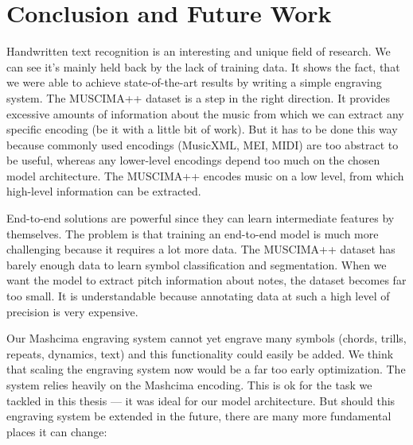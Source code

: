 \chapter{Conclusion and Future Work}
\label{chap:ConclusionAndFutureWork}

Handwritten text recognition is an interesting and unique field of research. We can see it's mainly held back by the lack of training data. It shows the fact, that we were able to achieve state-of-the-art results by writing a simple engraving system. The MUSCIMA++ dataset is a step in the right direction. It provides excessive amounts of information about the music from which we can extract any specific encoding (be it with a little bit of work). But it has to be done this way because commonly used encodings (MusicXML, MEI, MIDI) are too abstract to be useful, whereas any lower-level encodings depend too much on the chosen model architecture. The MUSCIMA++ encodes music on a low level, from which high-level information can be extracted.

End-to-end solutions are powerful since they can learn intermediate features by themselves. The problem is that training an end-to-end model is much more challenging because it requires a lot more data. The MUSCIMA++ dataset has barely enough data to learn symbol classification and segmentation. When we want the model to extract pitch information about notes, the dataset becomes far too small. It is understandable because annotating data at such a high level of precision is very expensive.

Our Mashcima engraving system cannot yet engrave many symbols (chords, trills, repeats, dynamics, text) and this functionality could easily be added. We think that scaling the engraving system now would be a far too early optimization. The system relies heavily on the Mashcima encoding. This is ok for the task we tackled in this thesis --- it was ideal for our model architecture. But should this engraving system be extended in the future, there are many more fundamental places it can change:

